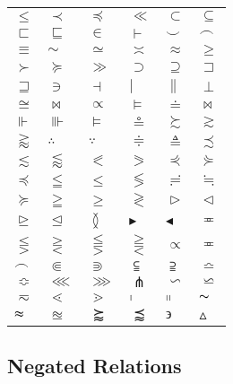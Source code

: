 \documentclass{article}
\begin{document}
\begin{tabular}{llllll}
$\leq $ & $\prec $ & $\preceq $ & $\ll $ & $\subset $ & $\subseteq $ \\ 
$\sqsubset $ & $\sqsubseteq $ & $\in $ & $\vdash $ & $\smile $ & $\frown $
\\ 
$\equiv $ & $\sim $ & $\simeq $ & $\asymp $ & $\approx $ & $\geq $ \\ 
$\succ $ & $\succeq $ & $\gg $ & $\supset $ & $\supseteq $ & $\sqsupset $ \\ 
$\sqsupseteq $ & $\ni $ & $\dashv $ & $\mid $ & $\parallel $ & $\perp $ \\ 
$\cong $ & $\bowtie $ & $\propto $ & $\models $ & $\doteq $ & $\Join $ \\ 
$\Vdash $ & $\Vvdash $ & $\vDash $ & $\circeq $ & $\succsim $ & $\gtrsim $
\\ 
$\gtrapprox $ & $\therefore $ & $\because $ & $\doteqdot $ & $\triangleq $ & 
$\precsim $ \\ 
$\lesssim $ & $\lessapprox $ & $\eqslantless $ & $\eqslantgtr $ & $%
\curlyeqprec $ & $\curlyeqsucc $ \\ 
$\preccurlyeq $ & $\leqq $ & $\leqslant $ & $\lessgtr $ & $\risingdotseq $ & 
$\fallingdotseq $ \\ 
$\succcurlyeq $ & $\geqq $ & $\geqslant $ & $\gtrless $ & $\vartriangleright 
$ & $\vartriangleleft $ \\ 
$\trianglerighteq $ & $\trianglelefteq $ & $\between $ & $%
\blacktriangleright $ & $\blacktriangleleft $ & $\eqcirc $ \\ 
$\lesseqgtr $ & $\gtreqless $ & $\lesseqqgtr $ & $\gtreqqless $ & $%
\varpropto $ & $\eqcirc $ \\ 
$\smallfrown $ & $\Subset $ & $\Supset $ & $\subseteqq $ & $\supseteqq $ & $%
\bumpeq $ \\ 
$\Bumpeq $ & $\lll $ & $\ggg $ & $\pitchfork $ & $\backsim $ & $\backsimeq $
\\ 
$\eqsim $ & $\lessdot $ & $\gtrdot $ & $\shortmid $ & $\shortparallel $ & $%
\thicksim $ \\ 
$\thickapprox $ & $\approxeq $ & $\succapprox $ & $\precapprox $ & $%
\backepsilon $ & $\vartriangle $%
\end{tabular}

\subsection{Negated Relations}
\end{document}
